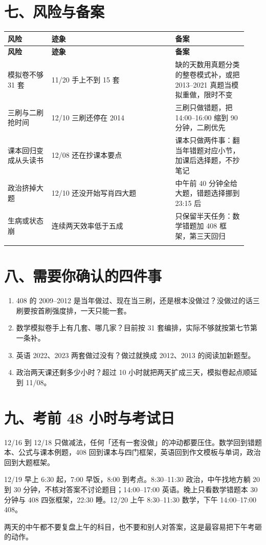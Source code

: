 \documentclass[UTF8,a4paper,11pt]{ctexart}
\begin{document}
\needspace{.34\textheight}\section{七、风险与备案}
{\small\renewcommand{\arraystretch}{1.38}\setlength{\tabcolsep}{3.5pt}
\begin{longtable}{P{0.17\linewidth}P{0.48\linewidth}P{0.28\linewidth}}
\toprule
\bfseries 风险 & \bfseries 迹象 & \bfseries 备案 \\
\midrule
\endfirsthead
\toprule
\bfseries 风险 & \bfseries 迹象 & \bfseries 备案 \\
\midrule
\endhead
模拟卷不够 31 套 & 11/20 手上不到 15 套 & 缺的天数用真题分类的整卷模式补，或把 2013–2021 真题当模拟重做，限时不变 \\
\addlinespace[.35em]
三刷与二刷抢时间 & 12/10 三刷还停在 2014 & 三刷只做错题，把 14:00–16:00 缩到 90 分钟，二刷优先 \\
\addlinespace[.35em]
课本回归变成从头读书 & 12/08 还在抄课本要点 & 课本只做两件事：翻当年错题对应小节，加课后选择题，不抄笔记 \\
\addlinespace[.35em]
政治挤掉大题 & 12/10 还没开始写肖四大题 & 中午前 40 分钟全给大题，错题选择挪到 23:15 后 \\
\addlinespace[.35em]
生病或状态崩 & 连续两天效率低于五成 & 只保留半天任务：数学错题加 408 框架，第三天回归 \\
\addlinespace[.35em]
\bottomrule
\end{longtable}
}
\needspace{.34\textheight}\section{八、需要你确认的四件事}
\begin{enumerate}
\item 408 的 2009–2012 是当年做过、现在当三刷，还是根本没做过？没做过的话三刷要按首刷强度排，一天只能一套。
\item 数学模拟卷手上有几套、哪几家？目前按 31 套编排，实际不够就按第七节第一条补。
\item 英语 2022、2023 两套做过没有？做过就换成 2012、2013 的阅读加新题型。
\item 政治两天课还剩多少小时？超过 10 小时就把两天扩成三天，模拟卷起点顺延到 11/08。
\end{enumerate}
\needspace{.34\textheight}\section{九、考前 48 小时与考试日}
12/16 到 12/18 只做减法，任何「还有一套没做」的冲动都要压住。数学回到错题本、公式与课本例题，408 回到课本与四门框架，英语回到作文模板与单词，政治回到大题框架。

12/19 早上 6:30 起，7:00 早饭，8:00 到考点。8:30–11:30 政治，中午找地方躺 20 到 30 分钟，不核对答案不讨论题目；14:00–17:00 英语。晚上只看数学错题本 30 分钟与 408 四张框架，22:30 睡。12/20 上午 8:30–11:30 数学，下午 14:00–17:00 408。

两天的中午都不要复盘上午的科目，也不要和别人对答案，这是最容易把下午考砸的动作。
\end{document}
